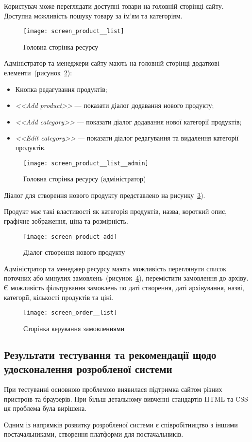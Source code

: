 Користувач може переглядати доступні товари на головній сторінці сайту.
Доступна можливість пошуку товару за ім'ям та категоріям.
\begin{figure}[H]
    \centering
    \texttt{[image: screen\_product\_\_list]}
    \caption{Головна сторінка ресурсу}
    \label{fig:site_product_list}
\end{figure}

Адміністратор та менеджери сайту мають на головній сторінці додаткові елементи~(рисунок~\ref{fig:site_product_list_admin}): 
\begin{itemize}
\item Кнопка редагування продуктів;
\item \textit{<<Add product>>} --- показати діалог додавання нового продукту;
\item \textit{<<Add category>>} --- показати діалог додавання нової категорії продуктів;
\item \textit{<<Edit category>>} --- показати діалог редагування та видалення категорії продуктів.
\end{itemize}
\begin{figure}[H]
    \centering
    \texttt{[image: screen\_product\_\_list\_\_admin]}
    \caption{Головна сторінка ресурсу (адміністратор)}
    \label{fig:site_product_list_admin}
\end{figure}

Діалог для створення нового продукту представлено на рисунку~\ref{fig:site_product_add}).

Продукт має такі властивості як категорія продуктів, назва, короткий опис, графічне зображення, ціна та розмірність.   
\begin{figure}[H]
    \centering
    \texttt{[image: screen\_product\_add]}
    \caption{Діалог створення нового продукту}
    \label{fig:site_product_add}
\end{figure}

Адміністратор та менеджер ресурсу мають можливість переглянути список поточних або минулих замовлень~(рисунок~\ref{fig:site_order_list}), перемістити замовлення до архіву.
Є можливість фільтрування замовлень по даті створення, даті архівування, назві, категорії, кількості продуктів та ціні.   
\begin{figure}[H]
    \centering
    \texttt{[image: screen\_order\_\_list]}
    \caption{Сторінка керування замовленнями}
    \label{fig:site_order_list}
\end{figure}

\subsection{Результати тестування та рекомендації щодо удосконалення розробленої системи}
При тестуванні основною проблемою виявилася підтримка сайтом різних пристроїв та браузерів. 
При більш детальному вивченні стандартів HTML та CSS ця проблема була вирішена.

Одним із напрямків розвитку розробленої системи є співробітництво з іншими постачальниками, створення платформи для постачальників. 
